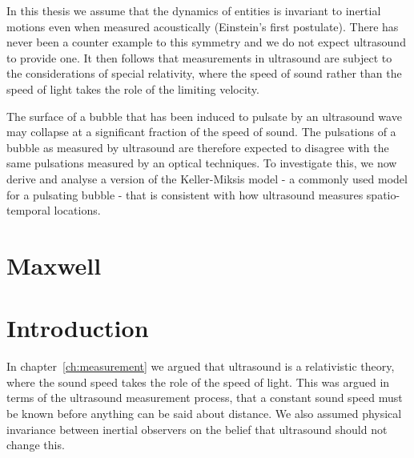 \documentclass[10pt, fleqn,draft,showtrims,oldfontcommands]{article} %
\newcommand{\chapref}[1]{chapter~\ref{ch:#1}}
\begin{document}
In this thesis we  assume that the dynamics of entities is invariant to inertial motions even when measured acoustically (Einstein's first postulate).
There has never been a counter example to this symmetry and we do not expect ultrasound to provide one.
It then follows that measurements in ultrasound are subject to the considerations of special relativity,
where the speed of sound rather than the speed of light takes the role of the limiting velocity.

The surface of a  bubble that has been induced to pulsate by an ultrasound wave may collapse at a significant fraction of the speed of sound\cite{Neppiras1980}.
The pulsations of a bubble as measured by ultrasound are therefore expected to disagree with the same pulsations measured by an optical techniques.
To investigate this, we now derive and analyse a version of the Keller-Miksis model\cite{Keller1980} 
- a commonly used model for a pulsating bubble - that is consistent with how ultrasound measures spatio-temporal locations.


\section{Maxwell}\label{sec:Maxwell}


\section{Introduction}

In \chapref{measurement} we argued that ultrasound is a relativistic theory,
where the sound speed takes the role of the speed of light.
This was argued in terms of the  ultrasound measurement process,
that a constant sound speed must be known before anything can be said about distance.
We also assumed  physical invariance between inertial observers
on the belief that ultrasound should not change this.
\end{document}
